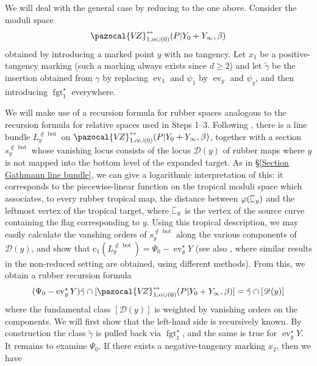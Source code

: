 \documentclass[11pt]{amsart}
\newcommand{\sqC}{\scalebox{0.8}[1.3]{$\sqsubset$}}
\newcommand{\VZ}{\pazocal{V\!Z}}
\newcommand{\st}{\star}
\newcommand{\ev}{\operatorname{ev}}
\newcommand{\fgt}{\operatorname{fgt}}
\newcommand{\Dcal}{\mathcal{D}}
\newcommand{\cchern}{\mathrm{c}}
\theoremstyle{definition}
\theoremstyle{definition}
\begin{document}
We will deal with the general case by reducing to the one above. Consider the moduli space
\begin{equation*}\label{step 4 recursion space} \VZ^{\leftrightarrow}_{1,\alpha\cup (0)}(P|Y_0+Y_\infty,\beta)\end{equation*}
obtained by introducing a marked point $y$ with no tangency. Let $x_1$ be a positive-tangency marking (such a marking always exists since $d \geq 2$) and let $\tilde\gamma$ be the insertion obtained from $\gamma$ by replacing $\ev_1$ and $\psi_1$ by $\ev_y$ and $\psi_y$, and then introducing $\fgt_{1}^\st$ everywhere.

We will make use of a recursion formula for rubber spaces analogous to the recursion formula for relative spaces used in Steps 1--3. Following \cite{EKatz}, there is a line bundle $L_y^{\not\in \operatorname{bot}}$ on $\VZ^{\leftrightarrow}_{1,\alpha\cup (0)}(P|Y_0+Y_\infty,\beta)$, together with a section $s_y^{\not\in\operatorname{bot}}$ whose vanishing locus consists of the locus $\Dcal(y)$ of rubber maps where $y$ is not mapped into the bottom level of the expanded target. As in \S \ref{Section Gathmann line bundle}, we can give a logarithmic interpretation of this: it corresponds to the piecewise-linear function on the tropical moduli space which associates, to every rubber tropical map, the distance between $\varphi(\sqC_y)$ and the leftmost vertex of the tropical target, where $\sqC_y$ is the vertex of the source curve containing the flag corresponding to $y$. Using this tropical description, we may easily calculate the vanshing orders of $s_y^{\not\in\operatorname{bot}}$ along the various components of $\Dcal(y)$, and show that $\cchern_1(L_y^{\not\in\operatorname{bot}}) = \Psi_0 - \ev_y^\st Y$ (see also \cite{EKatzLB}, where similar results in the non-reduced setting are obtained, using different methods). From this, we obtain a rubber recursion formula
\begin{equation}\label{step 4 recursion} (\Psi_0 - \ev_y^\st Y) \tilde\gamma \cap [\VZ^{\leftrightarrow}_{1,\alpha\cup(0)}(P|Y_0+Y_\infty,\beta)] = \tilde\gamma \cap [\Dcal(y)]\end{equation}
where the fundamental class $[\Dcal(y)]$ is weighted by vanishing orders on the components. We will first show that the left-hand side is recursively known. By construction the class $\tilde\gamma$ is pulled back via $\fgt_{1}^\st$, and the same is true for $\ev_y^\st Y$. It remains to examine $\Psi_0$. If there exists a negative-tangency marking $x_2$, then we have \cite[Construction 5.1.17]{GathmannThesis}
\end{document}

